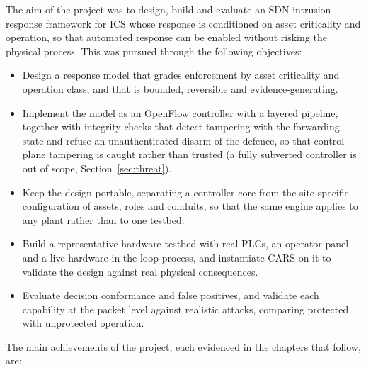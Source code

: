 \noindent
The aim of the project was to design, build and evaluate an SDN intrusion-response framework for ICS whose response is conditioned on asset criticality and operation, so that automated response can be enabled without risking the physical process. This was pursued through the following objectives:

\begin{itemize}
\item Design a response model that grades enforcement by asset criticality and operation class, and that is bounded, reversible and evidence-generating.
\item Implement the model as an OpenFlow controller with a layered pipeline, together with integrity checks that detect tampering with the forwarding state and refuse an unauthenticated disarm of the defence, so that control-plane tampering is caught rather than trusted (a fully subverted controller is out of scope, Section~\ref{sec:threat}).
\item Keep the design portable, separating a controller core from the site-specific configuration of assets, roles and conduits, so that the same engine applies to any plant rather than to one testbed.
\item Build a representative hardware testbed with real PLCs, an operator panel and a live hardware-in-the-loop process, and instantiate CARS on it to validate the design against real physical consequences.
\item Evaluate decision conformance and false positives, and validate each capability at the packet level against realistic attacks, comparing protected with unprotected operation.
\end{itemize}

\noindent
The main achievements of the project, each evidenced in the chapters that follow, are:


